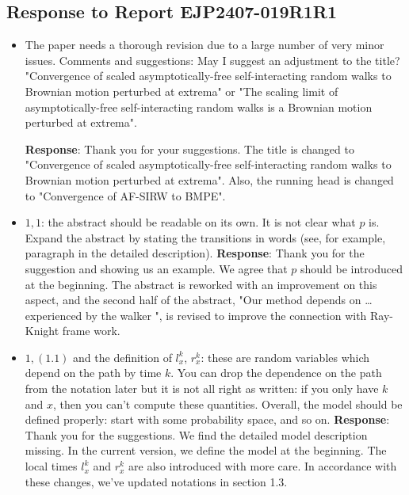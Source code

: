 \documentclass[11pt,a4paper]{article}
\numberwithin{equation}{section}
\begin{document}
	
	
	\newpage
	\subsection*{Response to Report EJP2407-019R1R1}
	\begin{itemize}
		\item The paper needs a thorough revision due to a large number of very minor issues.
		Comments and suggestions: May I suggest an adjustment to the title? "Convergence of scaled
		asymptotically-free self-interacting random walks to Brownian motion perturbed at extrema" or "The scaling limit of asymptotically-free self-interacting random walks is a Brownian motion perturbed at
		extrema".
		
		\subitem \textbf{Response}:  Thank you for your suggestions. The title is changed to "Convergence of scaled asymptotically-free
		self-interacting random walks to Brownian motion
		perturbed at extrema". Also, the running head is changed to "Convergence of AF-SIRW to BMPE". 
		
		\item 
		$1,1$: the abstract should be readable on its own. It is not clear what $p$ is. Expand the abstract by stating the transitions in words (see, for example, paragraph in the detailed description).
		\subitem \textbf{Response}: Thank you for the suggestion and showing us an example. We agree that $p$ should be introduced at the beginning. The abstract is reworked with an improvement on this aspect, and the second half of the abstract, "Our method depends on \dots experienced by the walker ", is revised to improve the connection with Ray-Knight frame work. 
		
		\item 
		$1,(1.1)$ and the definition of $l_x^k$, $r_x^k$: these are random variables which depend on the path by time $k$. You can drop the dependence on the path from the notation later but it is not all right as written:	if you only have $k$ and $x$, then you can't compute these quantities. Overall, the model should be defined properly: start with some probability space, and so on.
		\subitem \textbf{Response}: Thank you for the suggestions. We find the detailed model description missing. In the current version, we define the model at the beginning. The local times $l_x^k$ and $r_x^k$ are also introduced with more care.  In accordance with these changes, we've updated notations in section 1.3.
		

\end{itemize}
\end{document}
